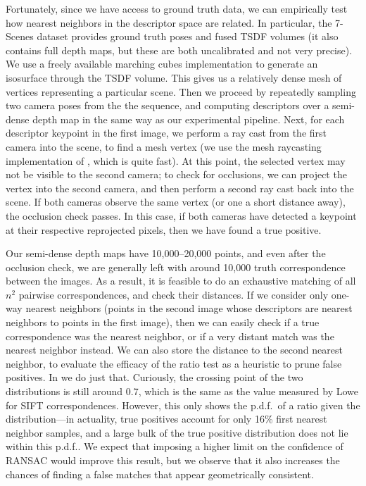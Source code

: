 Fortunately, since we have access to ground truth data, we can empirically test how nearest neighbors in the descriptor space are related. In particular, the 7-Scenes dataset provides ground truth poses and fused TSDF volumes (it also contains full depth maps, but these are both uncalibrated and not very precise). We use a freely available marching cubes implementation \cite{ramachandran2011mayavi} to generate an isosurface through the TSDF volume. This gives us a relatively dense mesh of vertices representing a particular scene. Then we proceed by repeatedly sampling two camera poses from the the sequence, and computing descriptors over a semi-dense depth map in the same way as our experimental pipeline. Next, for each descriptor keypoint in the first image, we perform a ray cast from the first camera into the scene, to find a mesh vertex (we use the mesh raycasting implementation of \cite{woop2013embree}, which is quite fast). At this point, the selected vertex may not be visible to the second camera; to check for occlusions, we can project the vertex into the second camera, and then perform a second ray cast back into the scene. If both cameras observe the same vertex (or one a short distance away), the occlusion check passes. In this case, if both cameras have detected a keypoint at their respective reprojected pixels, then we have found a true positive.

Our semi-dense depth maps have 10,000--20,000 points, and even after the occlusion check, we are generally left with around 10,000 truth correspondence between the images. As a result, it is feasible to do an exhaustive matching of all $n^2$ pairwise correspondences, and check their distances. If we consider only one-way nearest neighbors (points in the second image whose descriptors are nearest neighbors to points in the first image), then we can easily check if a true correspondence was the nearest neighbor, or if a very distant match was the nearest neighbor instead. We can also store the distance to the second nearest neighbor, to evaluate the efficacy of the ratio test as a heuristic to prune false positives. In  we do just that. Curiously, the crossing point of the two distributions is still around 0.7, which is the same as the value measured by Lowe \cite{lowe1999object} for SIFT correspondences. However, this only shows the p.d.f.\ of a ratio given the distribution---in actuality, true positives account for only 16\% first nearest neighbor samples, and a large bulk of the true positive distribution does not lie within this p.d.f.. We expect that imposing a higher limit on the confidence of RANSAC would improve this result, but we observe that it also increases the chances of finding a false matches that appear geometrically consistent.

